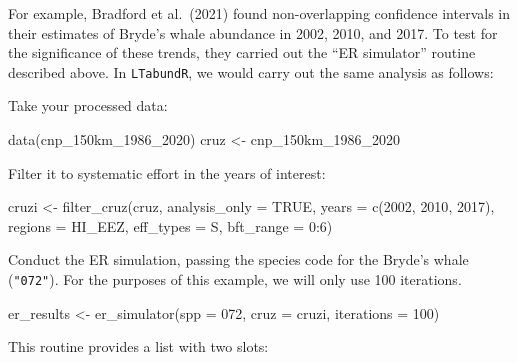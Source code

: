 \documentclass[
]{book}
\newenvironment{Shaded}{\begin{snugshade}}{\end{snugshade}}
\newcommand{\AttributeTok}[1]{\textcolor[rgb]{0.77,0.63,0.00}{#1}}
\newcommand{\ConstantTok}[1]{\textcolor[rgb]{0.00,0.00,0.00}{#1}}
\newcommand{\DecValTok}[1]{\textcolor[rgb]{0.00,0.00,0.81}{#1}}
\newcommand{\FunctionTok}[1]{\textcolor[rgb]{0.00,0.00,0.00}{#1}}
\newcommand{\NormalTok}[1]{#1}
\newcommand{\OtherTok}[1]{\textcolor[rgb]{0.56,0.35,0.01}{#1}}
\newcommand{\SpecialCharTok}[1]{\textcolor[rgb]{0.00,0.00,0.00}{#1}}
\newcommand{\StringTok}[1]{\textcolor[rgb]{0.31,0.60,0.02}{#1}}
\begin{document}
For example, Bradford et al.~(2021) found non-overlapping confidence intervals in their estimates of Bryde's whale abundance in 2002, 2010, and 2017. To test for the significance of these trends, they carried out the ``ER simulator'' routine described above. In \texttt{LTabundR}, we would carry out the same analysis as follows:

Take your processed data:

\begin{Shaded}
\begin{Highlighting}[]
\FunctionTok{data}\NormalTok{(cnp\_150km\_1986\_2020)}
\NormalTok{cruz }\OtherTok{\textless{}{-}}\NormalTok{ cnp\_150km\_1986\_2020}
\end{Highlighting}
\end{Shaded}

Filter it to systematic effort in the years of interest:

\begin{Shaded}
\begin{Highlighting}[]
\NormalTok{cruzi }\OtherTok{\textless{}{-}} 
  \FunctionTok{filter\_cruz}\NormalTok{(cruz,}
              \AttributeTok{analysis\_only =} \ConstantTok{TRUE}\NormalTok{,}
              \AttributeTok{years =} \FunctionTok{c}\NormalTok{(}\DecValTok{2002}\NormalTok{, }\DecValTok{2010}\NormalTok{, }\DecValTok{2017}\NormalTok{),}
              \AttributeTok{regions =} \StringTok{\textquotesingle{}HI\_EEZ\textquotesingle{}}\NormalTok{,}
              \AttributeTok{eff\_types =} \StringTok{\textquotesingle{}S\textquotesingle{}}\NormalTok{,}
              \AttributeTok{bft\_range =} \DecValTok{0}\SpecialCharTok{:}\DecValTok{6}\NormalTok{)}
\end{Highlighting}
\end{Shaded}

Conduct the ER simulation, passing the species code for the Bryde's whale (\texttt{"072"}). For the purposes of this example, we will only use 100 iterations.

\begin{Shaded}
\begin{Highlighting}[]
\NormalTok{er\_results }\OtherTok{\textless{}{-}} 
  \FunctionTok{er\_simulator}\NormalTok{(}\AttributeTok{spp =} \StringTok{\textquotesingle{}072\textquotesingle{}}\NormalTok{, }\AttributeTok{cruz =}\NormalTok{ cruzi, }\AttributeTok{iterations =} \DecValTok{100}\NormalTok{)}
\end{Highlighting}
\end{Shaded}

This routine provides a list with two slots:
\end{document}
